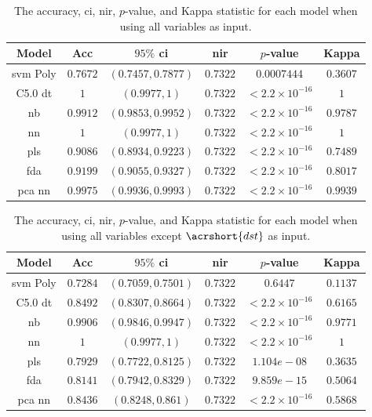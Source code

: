 \documentclass[sn-mathphys-num]{sn-jnl}%
\begin{document}
\begin{table}[!ht]
    \centering
    \caption{The accuracy, \acrshort{ci}, \acrshort{nir}, $p$-value, and Kappa statistic for each model when using all variables as input.}
	\label{tab:stats:reverse:all}
	\begin{tabular}{|c|c|c|c|c|c|}
		\hline
		Model & Acc & $95\%$ \acrshort{ci} & \acrshort{nir} & $p$-value & Kappa \\ \hline
		\acrshort{svm} Poly & $0.7672$ & $(0.7457, 0.7877)$ & $0.7322$ & $0.0007444$ & $0.3607$ \\ \hline
		C5.0 \acrshort{dt} & $1$ & $(0.9977, 1)$ & $0.7322$ & $< 2.2 \times {10}^{-16}$ & $1$ \\ \hline
		\acrshort{nb} & $0.9912$ & $(0.9853, 0.9952)$ & $0.7322$ & $< 2.2 \times {10}^{-16}$ & $0.9787$ \\ \hline
		\acrshort{nn} & $1$ & $(0.9977, 1)$ & $0.7322$ & $< 2.2 \times {10}^{-16}$ & $1$ \\ \hline
		\acrshort{pls} & $0.9086$ & $(0.8934, 0.9223)$ & $0.7322$ & $< 2.2 \times {10}^{-16}$ & $0.7489$ \\ \hline
		\acrshort{fda} & $0.9199$ & $(0.9055, 0.9327)$ & $0.7322$ & $< 2.2 \times {10}^{-16}$ & $0.8017$ \\ \hline
		\acrshort{pca} \acrshort{nn} & $0.9975$ & $(0.9936, 0.9993)$ & $0.7322$ & $< 2.2 \times {10}^{-16}$ & $0.9939$ \\ \hline
	\end{tabular}
\end{table}

\begin{table}[!ht]
    \centering
    \caption{The accuracy, \acrshort{ci}, \acrshort{nir}, $p$-value, and Kappa statistic for each model when using all variables except $\acrshort{dst}$ as input.}
	\label{tab:stats:reverse:no_DisturbanceStormTime}
	\begin{tabular}{|c|c|c|c|c|c|}
		\hline
		Model & Acc & $95\%$ \acrshort{ci} & \acrshort{nir} & $p$-value & Kappa \\ \hline
		\acrshort{svm} Poly & $0.7284$ & $(0.7059, 0.7501)$ & $0.7322$ & $0.6447$ & $0.1137$ \\ \hline
		C5.0 \acrshort{dt} & $0.8492$ & $(0.8307, 0.8664)$ & $0.7322$ & $< 2.2 \times {10}^{-16}$ & $0.6165$ \\ \hline
		\acrshort{nb} & $0.9906$ & $(0.9846, 0.9947)$ & $0.7322$ & $< 2.2 \times {10}^{-16}$ & $0.9771$ \\ \hline
		\acrshort{nn} & $1$ & $(0.9977, 1)$ & $0.7322$ & $< 2.2 \times {10}^{-16}$ & $1$ \\ \hline
		\acrshort{pls} & $0.7929$ & $(0.7722, 0.8125)$ & $0.7322$ & $1.104e-08$ & $0.3635$ \\ \hline
		\acrshort{fda} & $0.8141$ & $(0.7942, 0.8329)$ & $0.7322$ & $9.859e-15$ & $0.5064$ \\ \hline
		\acrshort{pca} \acrshort{nn} & $0.8436$ & $(0.8248, 0.861)$ & $0.7322$ & $< 2.2 \times {10}^{-16}$ & $0.5868$ \\ \hline
	\end{tabular}
\end{table}
\end{document}
